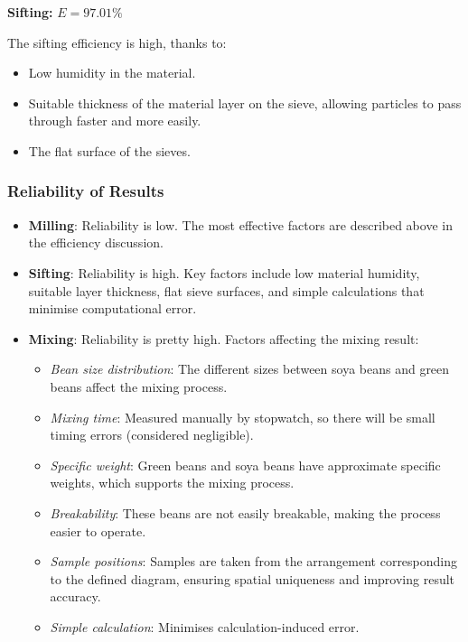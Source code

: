 \textbf{Sifting:} $E = 97.01\%$

The sifting efficiency is high, thanks to:
\begin{itemize}
    \item Low humidity in the material.
    \item Suitable thickness of the material layer on the sieve, allowing particles to pass through faster and more easily.
    \item The flat surface of the sieves.
\end{itemize}

\subsubsection{Reliability of Results}

\begin{itemize}
    \item \textbf{Milling}: Reliability is low. The most effective factors are described above in the efficiency discussion.
    \item \textbf{Sifting}: Reliability is high. Key factors include low material humidity, suitable layer thickness, flat sieve surfaces, and simple calculations that minimise computational error.
    \item \textbf{Mixing}: Reliability is pretty high. Factors affecting the mixing result:
        \begin{itemize}
            \item \textit{Bean size distribution}: The different sizes between soya beans and green beans affect the mixing process.
            \item \textit{Mixing time}: Measured manually by stopwatch, so there will be small timing errors (considered negligible).
            \item \textit{Specific weight}: Green beans and soya beans have approximate specific weights, which supports the mixing process.
            \item \textit{Breakability}: These beans are not easily breakable, making the process easier to operate.
            \item \textit{Sample positions}: Samples are taken from the arrangement corresponding to the defined diagram, ensuring spatial uniqueness and improving result accuracy.
            \item \textit{Simple calculation}: Minimises calculation-induced error.
        \end{itemize}
\end{itemize}

